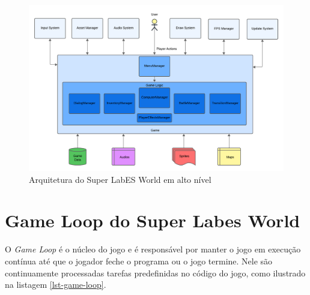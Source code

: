 \begin{figure}[h!]
    \centering
    \includegraphics[width=1\linewidth]{figuras/game-architecture.png}
    \caption{Arquitetura do Super LabES World em alto nível}
    \label{fig:game-architecture}
\end{figure}
  

\clearpage
\section{Game Loop do Super Labes World}
\label{sec:game-loop-super-labes-world}

O \textit{Game Loop} é o núcleo do jogo e é responsável por manter o jogo em execução contínua até que o jogador feche o programa ou o jogo termine. Nele são continuamente processadas tarefas predefinidas no código do jogo, como ilustrado na listagem \ref{lst-game-loop}.



